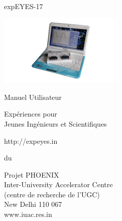 \documentclass[12pt,a4paper]{report}
\begin{document}
\begin{titlepage}
\thispagestyle{empty}

\vspace{0.2in}

\begin{center}
{\Huge{}expEYES-17}
\par\end{center}{\Huge \par}

\begin{center}
\includegraphics[width=6cm]{../pics/eyes17-nb}
\par\end{center}

\begin{center}
{\large{}Manuel Utilisateur }
\par\end{center}{\large \par}

\begin{center}
{\LARGE{}Expériences pour}\\
{\LARGE{} Jeunes Ingénieurs et Scientifiques}
\par\end{center}{\LARGE \par}

\begin{center}
http://expeyes.in
\par\end{center}

\begin{center}
du
\par\end{center}

\begin{center}
Projet PHOENIX\\
Inter-University Accelerator Centre \\
(centre de recherche de l'UGC)\\
New Delhi 110 067\\
www.iuac.res.in
\par\end{center}

\end{titlepage}
\end{document}
